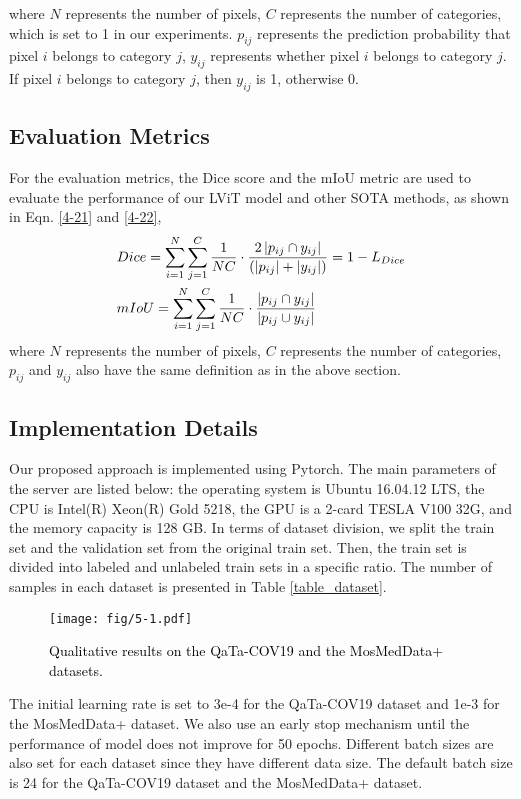 \documentclass[lettersize,journal]{IEEEtran}
\begin{document}
where $N$ represents the number of pixels, $C$ represents the number of categories, which is set to 1 in our experiments. $p_{ij}$ represents the prediction probability that pixel $i$ belongs to category $j$, $y_{ij}$ represents whether pixel $i$ belongs to category $j$. If pixel $i$ belongs to category $j$, then $y_{ij}$ is 1, otherwise 0.

\subsection{Evaluation Metrics}
For the evaluation metrics, the Dice score and the mIoU metric are used to evaluate the performance of our LViT model and other SOTA methods, as shown in Eqn. \ref{4-21} and \ref{4-22},
\begin{eqnarray}
&\setlength{\belowdisplayskip}{3pt}
Dice=\sum_{i=1}^{N}\sum_{j=1}^{C}{\frac{1}{NC}\cdot\frac{2\left|p_{ij}\cap y_{ij}\right|}{\left(\left|p_{ij}\right|+\left|y_{ij}\right|\right)}}=1-L_{Dice}
\label{4-21}
\\
&mIoU=\sum_{i=1}^{N}\sum_{j=1}^{C}{\frac{1}{NC}\cdot\frac{|p_{ij}\cap y_{ij}|}{|p_{ij}\cup y_{ij}|}}
\label{4-22}
\setlength{\abovedisplayskip}{3pt}
\end{eqnarray}
where $N$ represents the number of pixels, $C$ represents the number of categories, $p_{ij}$ and $y_{ij}$ also have the same definition as in the above section.
\vspace{-2mm}
\subsection{Implementation Details}
Our proposed approach is implemented using Pytorch. The main parameters of the server are listed below: the operating system is Ubuntu 16.04.12 LTS, the CPU is Intel(R) Xeon(R) Gold 5218, the GPU is a 2-card TESLA V100 32G, and the memory capacity is 128 GB. 
In terms of dataset division, we split the train set and the validation set from the original train set. Then, the train set is divided into labeled and unlabeled train sets in a specific ratio. The number of samples in each dataset is presented in Table \ref{table_dataset}.

\begin{figure*}[!ht]
\centering
  \texttt{[image: fig/5-1.pdf]}
  \caption{\textcolor{black}{Qualitative results on the QaTa-COV19 and the MosMedData+ datasets.}}
  \label{ExpToSOTA}
  \vspace{-3mm}
\end{figure*}
The initial learning rate is set to 3e-4 for the QaTa-COV19 dataset and 1e-3 for the MosMedData+ dataset. We also use an early stop mechanism until the performance of model does not improve for 50 epochs. Different batch sizes are also set for each dataset since they have different data size. The default batch size is 24 for the QaTa-COV19 dataset and the MosMedData+ dataset. 
\end{document}

